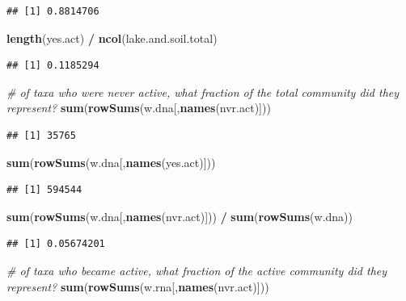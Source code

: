 \documentclass[]{article}
\newenvironment{Shaded}{\begin{snugshade}}{\end{snugshade}}
\newcommand{\KeywordTok}[1]{\textcolor[rgb]{0.13,0.29,0.53}{\textbf{#1}}}
\newcommand{\StringTok}[1]{\textcolor[rgb]{0.31,0.60,0.02}{#1}}
\newcommand{\CommentTok}[1]{\textcolor[rgb]{0.56,0.35,0.01}{\textit{#1}}}
\newcommand{\OperatorTok}[1]{\textcolor[rgb]{0.81,0.36,0.00}{\textbf{#1}}}
\newcommand{\NormalTok}[1]{#1}
\begin{document}
\begin{verbatim}
## [1] 0.8814706
\end{verbatim}

\begin{Shaded}
\begin{Highlighting}[]
\KeywordTok{length}\NormalTok{(yes.act) }\OperatorTok{/}\StringTok{ }\KeywordTok{ncol}\NormalTok{(lake.and.soil.total)}
\end{Highlighting}
\end{Shaded}

\begin{verbatim}
## [1] 0.1185294
\end{verbatim}

\begin{Shaded}
\begin{Highlighting}[]
\CommentTok{# of taxa who were never active, what fraction of the total community did they represent?}
\KeywordTok{sum}\NormalTok{(}\KeywordTok{rowSums}\NormalTok{(w.dna[,}\KeywordTok{names}\NormalTok{(nvr.act)]))}
\end{Highlighting}
\end{Shaded}

\begin{verbatim}
## [1] 35765
\end{verbatim}

\begin{Shaded}
\begin{Highlighting}[]
\KeywordTok{sum}\NormalTok{(}\KeywordTok{rowSums}\NormalTok{(w.dna[,}\KeywordTok{names}\NormalTok{(yes.act)]))}
\end{Highlighting}
\end{Shaded}

\begin{verbatim}
## [1] 594544
\end{verbatim}

\begin{Shaded}
\begin{Highlighting}[]
\KeywordTok{sum}\NormalTok{(}\KeywordTok{rowSums}\NormalTok{(w.dna[,}\KeywordTok{names}\NormalTok{(nvr.act)])) }\OperatorTok{/}\StringTok{ }\KeywordTok{sum}\NormalTok{(}\KeywordTok{rowSums}\NormalTok{(w.dna))}
\end{Highlighting}
\end{Shaded}

\begin{verbatim}
## [1] 0.05674201
\end{verbatim}

\begin{Shaded}
\begin{Highlighting}[]
\CommentTok{# of taxa who became active, what fraction of the active community did they represent?}
\KeywordTok{sum}\NormalTok{(}\KeywordTok{rowSums}\NormalTok{(w.rna[,}\KeywordTok{names}\NormalTok{(nvr.act)]))}
\end{Highlighting}
\end{Shaded}
\end{document}
